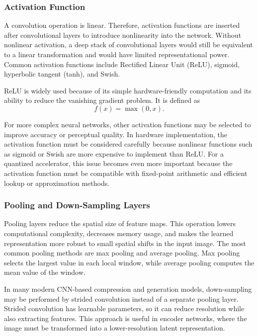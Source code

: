 \documentclass[11pt]{report}
\begin{document}
\subsubsection{Activation Function}

A convolution operation is linear. Therefore, activation functions are inserted after convolutional layers to introduce nonlinearity into the network. Without nonlinear activation, a deep stack of convolutional layers would still be equivalent to a linear transformation and would have limited representational power. Common activation functions include Rectified Linear Unit (ReLU), sigmoid, hyperbolic tangent (tanh), and Swish.

ReLU is widely used because of its simple hardware-friendly computation and its ability to reduce the vanishing gradient problem. It is defined as
\begin{equation}
f(x) = \max(0, x).
\end{equation}

For more complex neural networks, other activation functions may be selected to improve accuracy or perceptual quality. In hardware implementation, the activation function must be considered carefully because nonlinear functions such as sigmoid or Swish are more expensive to implement than ReLU. For a quantized accelerator, this issue becomes even more important because the activation function must be compatible with fixed-point arithmetic and efficient lookup or approximation methods.

\subsubsection{Pooling and Down-Sampling Layers}

Pooling layers reduce the spatial size of feature maps. This operation lowers computational complexity, decreases memory usage, and makes the learned representation more robust to small spatial shifts in the input image. The most common pooling methods are max pooling and average pooling. Max pooling selects the largest value in each local window, while average pooling computes the mean value of the window.

In many modern CNN-based compression and generation models, down-sampling may be performed by strided convolution instead of a separate pooling layer. Strided convolution has learnable parameters, so it can reduce resolution while also extracting features. This approach is useful in encoder networks, where the image must be transformed into a lower-resolution latent representation.
\end{document}
